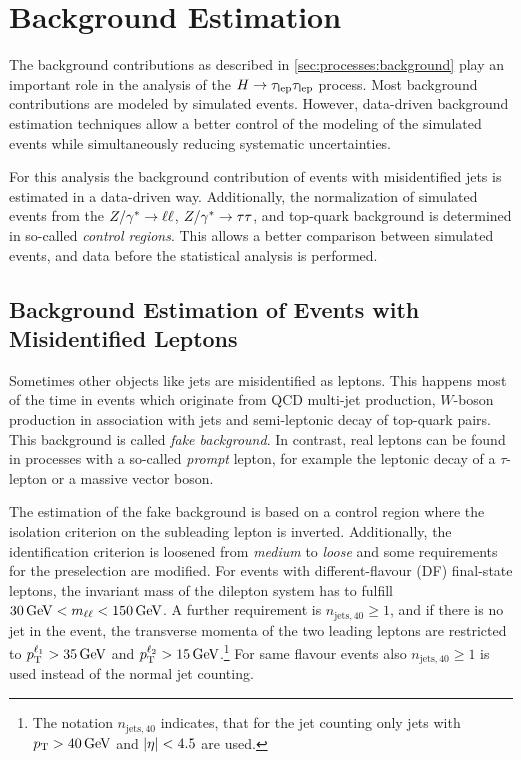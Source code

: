 \chapter{Background Estimation}\label{cha:background_estimation}

The background contributions as described in \cref{sec:processes:background} play an important role
in the analysis of the $H \to \tau_\text{lep} \tau_\text{lep}$ process.
Most background contributions are modeled by simulated events.
However, data-driven background estimation techniques allow a better control of the modeling of the simulated
events while simultaneously reducing systematic uncertainties.

For this analysis the background contribution of events with misidentified jets is estimated in a data-driven way.
Additionally, the normalization of simulated events from the $Z / \gamma^* \to \ell \ell$, $Z / \gamma^* \to \tau \tau$, and top-quark background is determined
in so-called \emph{control regions}.
This allows a better comparison between simulated events, and data before the statistical analysis is performed.

\section{Background Estimation of Events with Misidentified Leptons}\label{sec:background_estimation:fakes}

Sometimes other objects like jets are misidentified as leptons.
This happens most of the time in events which originate from QCD multi-jet production, $W$-boson production in association with jets
and semi-leptonic decay of top-quark pairs.
This background is called \emph{fake background}.
In contrast, real leptons can be found in processes with a so-called \emph{prompt} lepton, for example the leptonic decay of
a $\tau$-lepton or a massive vector boson.

The estimation of the fake background is based on a control region where the isolation criterion on the subleading lepton
is inverted.
Additionally, the identification criterion is loosened from \emph{medium} to \emph{loose} and some requirements for the preselection are modified.
For events with different-flavour (DF) final-state leptons, the invariant mass of the dilepton system has to fulfill $\SI{30}{\GeV} < \mll < \SI{150}{\GeV}$.
A further requirement is $n_{\text{jets},40} \geq 1$, and if there is no jet in the event, the
transverse momenta of the two leading leptons are restricted to $\pt^{\ell_1} > \SI{35}{\GeV}$ and
$\pt^{\ell_2} > \SI{15}{\GeV}$.\footnote{The notation $n_{\text{jets},40}$ indicates, that for the jet counting only jets with $\pt > \SI{40}{\GeV}$ and $\left|\eta\right| < 4.5$ are used.}
For same flavour events also $n_{\text{jets},40} \geq 1$ is used instead of the normal jet counting.

